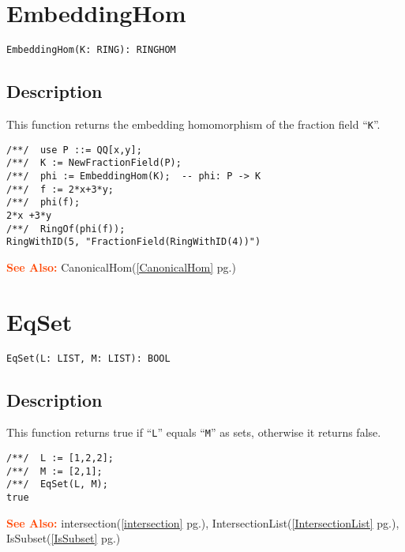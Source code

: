 \documentclass[a4paper]{mybook}
\newenvironment{command}{}{} %
\newcommand\SeeAlso{\par\textcolor{OrangeRed}{\textbf{\large See Also: }}}
\begin{document}
\section{EmbeddingHom}
\label{EmbeddingHom}
\begin{command} %


\begin{Verbatim}[label=syntax, rulecolor=\color{MidnightBlue},
frame=single]
EmbeddingHom(K: RING): RINGHOM
\end{Verbatim}


\subsection*{Description}

This function returns the embedding homomorphism of the
fraction field ``\verb&K&''.
\begin{Verbatim}[label=example, rulecolor=\color{PineGreen}, frame=single]
/**/  use P ::= QQ[x,y];
/**/  K := NewFractionField(P);
/**/  phi := EmbeddingHom(K);  -- phi: P -> K
/**/  f := 2*x+3*y;
/**/  phi(f);
2*x +3*y
/**/  RingOf(phi(f));
RingWithID(5, "FractionField(RingWithID(4))")
\end{Verbatim}


\SeeAlso %
  CanonicalHom(\ref{CanonicalHom} pg.\pageref{CanonicalHom})
\end{command} %

\section{EqSet}
\label{EqSet}
\begin{command} %


\begin{Verbatim}[label=syntax, rulecolor=\color{MidnightBlue},
frame=single]
EqSet(L: LIST, M: LIST): BOOL
\end{Verbatim}


\subsection*{Description}

This function returns true if ``\verb&L&'' equals ``\verb&M&'' as sets,
otherwise it returns false.
\begin{Verbatim}[label=example, rulecolor=\color{PineGreen}, frame=single]
/**/  L := [1,2,2];
/**/  M := [2,1];
/**/  EqSet(L, M);
true
\end{Verbatim}


\SeeAlso %
  intersection(\ref{intersection} pg.\pageref{intersection}), 
    IntersectionList(\ref{IntersectionList} pg.\pageref{IntersectionList}), 
    IsSubset(\ref{IsSubset} pg.\pageref{IsSubset})
\end{command} %
\end{document}
